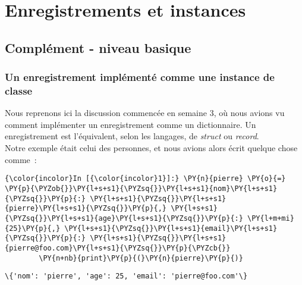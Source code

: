     \hypertarget{enregistrements-et-instances}{%
\section{Enregistrements et
instances}\label{enregistrements-et-instances}}

    \hypertarget{compluxe9ment---niveau-basique}{%
\subsection{Complément - niveau
basique}\label{compluxe9ment---niveau-basique}}

    \hypertarget{un-enregistrement-impluxe9mentuxe9-comme-une-instance-de-classe}{%
\subsubsection{Un enregistrement implémenté comme une instance de
classe}\label{un-enregistrement-impluxe9mentuxe9-comme-une-instance-de-classe}}

    Nous reprenons ici la discussion commencée en semaine 3, où nous avions
vu comment implémenter un enregistrement comme un dictionnaire. Un
enregistrement est l'équivalent, selon les langages, de \emph{struct} ou
\emph{record}.\\

    Notre exemple était celui des personnes, et nous avions alors écrit
quelque chose comme~:

    \begin{Verbatim}[commandchars=\\\{\}]
{\color{incolor}In [{\color{incolor}1}]:} \PY{n}{pierre} \PY{o}{=} \PY{p}{\PYZob{}}\PY{l+s+s1}{\PYZsq{}}\PY{l+s+s1}{nom}\PY{l+s+s1}{\PYZsq{}}\PY{p}{:} \PY{l+s+s1}{\PYZsq{}}\PY{l+s+s1}{pierre}\PY{l+s+s1}{\PYZsq{}}\PY{p}{,} \PY{l+s+s1}{\PYZsq{}}\PY{l+s+s1}{age}\PY{l+s+s1}{\PYZsq{}}\PY{p}{:} \PY{l+m+mi}{25}\PY{p}{,} \PY{l+s+s1}{\PYZsq{}}\PY{l+s+s1}{email}\PY{l+s+s1}{\PYZsq{}}\PY{p}{:} \PY{l+s+s1}{\PYZsq{}}\PY{l+s+s1}{pierre@foo.com}\PY{l+s+s1}{\PYZsq{}}\PY{p}{\PYZcb{}}
        \PY{n+nb}{print}\PY{p}{(}\PY{n}{pierre}\PY{p}{)}
\end{Verbatim}


    \begin{Verbatim}[commandchars=\\\{\}]
\{'nom': 'pierre', 'age': 25, 'email': 'pierre@foo.com'\}

    \end{Verbatim}

